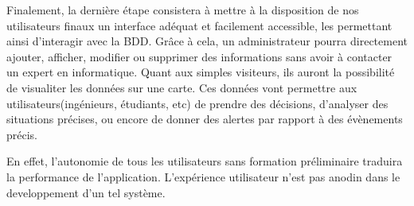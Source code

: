 \par
Finalement, la dernière étape consistera à mettre à la disposition 
de nos utilisateurs finaux un interface adéquat et facilement 
accessible, les permettant ainsi d'interagir avec la BDD. Grâce 
à cela, un administrateur pourra directement ajouter, afficher, modifier ou supprimer 
des informations sans avoir à contacter un expert en informatique.
Quant aux simples visiteurs, ils auront la possibilité de visualiter les données sur une carte. 
Ces données vont permettre aux utilisateurs(ingénieurs, étudiants, etc) de prendre des décisions, 
d’analyser des situations précises, ou encore de donner des alertes par rapport à des évènements précis.
\par
En effet, l'autonomie de tous les utilisateurs sans formation préliminaire 
traduira la performance de l'application. L'expérience utilisateur n'est pas anodin dans 
le developpement d'un tel système.